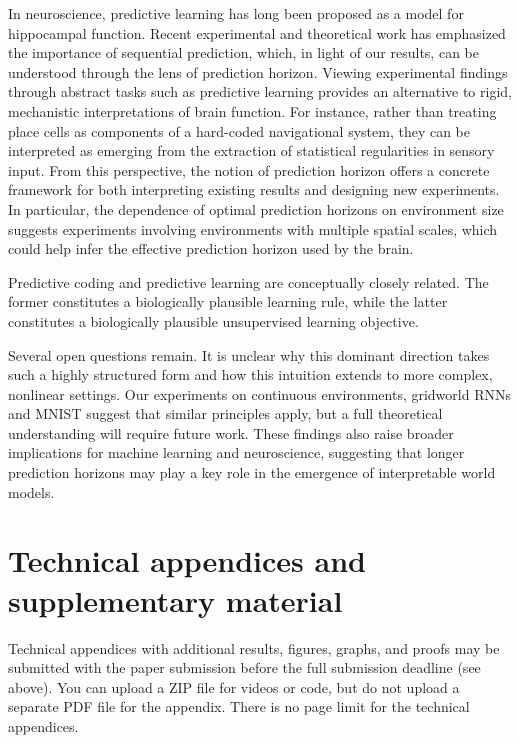 \documentclass{article}
\begin{document}
In neuroscience, predictive learning has long been proposed as a model for hippocampal function. Recent experimental \cite{vollan2025left} and theoretical \cite{levenstein2024sequential} work has emphasized the importance of sequential prediction, which, in light of our results, can be understood through the lens of prediction horizon. Viewing experimental findings through abstract tasks such as predictive learning provides an alternative to rigid, mechanistic interpretations of brain function. For instance, rather than treating place cells as components of a hard-coded navigational system, they can be interpreted as emerging from the extraction of statistical regularities in sensory input. From this perspective, the notion of prediction horizon offers a concrete framework for both interpreting existing results and designing new experiments. In particular, the dependence of optimal prediction horizons on environment size suggests experiments involving environments with multiple spatial scales, which could help infer the effective prediction horizon used by the brain.

Predictive coding and predictive learning are conceptually closely related. The former constitutes a biologically plausible learning rule, while the latter constitutes a biologically plausible unsupervised learning objective. 

Several open questions remain. It is unclear why this dominant direction takes such a highly structured form and how this intuition extends to more complex, nonlinear settings. Our experiments on continuous environments, gridworld RNNs and MNIST suggest that similar principles apply, but a full theoretical understanding will require future work. These findings also raise broader implications for machine learning and neuroscience, suggesting that longer prediction horizons may play a key role in the emergence of interpretable world models. 


\newpage





\appendix

\section{Technical appendices and supplementary material}
Technical appendices with additional results, figures, graphs, and proofs may be submitted with the paper submission before the full submission deadline (see above). You can upload a ZIP file for videos or code, but do not upload a separate PDF file for the appendix. There is no page limit for the technical appendices. 
\end{document}
